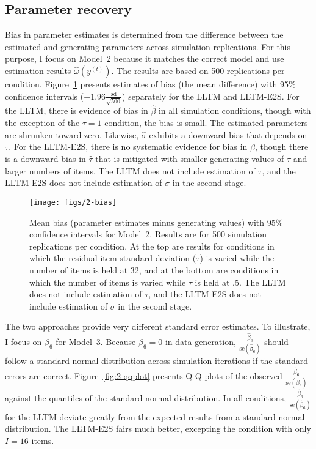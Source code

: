 \subsection{Parameter recovery}

Bias in parameter estimates is determined from the difference between the estimated and generating parameters across simulation replications. 
For this purpose, I focus on Model~2 because it matches the correct model and use estimation results $\hat \omega(y^{(t)})$. 
The results are based on 500 replications per condition. 
Figure~\ref{fig:2-bias} presents estimates of bias (the mean difference) with 95\% confidence intervals ($\pm 1.96 \frac{\mathrm{sd}}{\sqrt{500}}$) separately for the LLTM and LLTM-E2S. 
For the LLTM, there is evidence of bias in $\hat \beta$ in all simulation conditions, though with the exception of the $\tau=1$ condition, the bias is small. 
The estimated parameters are shrunken toward zero.
Likewise, $\hat \sigma$ exhibits a downward bias that depends on $\tau$.
For the LLTM-E2S, there is no systematic evidence for bias in $\hat \beta$, though there is a downward bias in $\hat \tau$ that is mitigated with smaller generating values of $\tau$ and larger numbers of items.
The LLTM does not include estimation of $\tau$, and the LLTM-E2S does not include estimation of $\sigma$ in the second stage.

\begin{figure}
	\centering
	\texttt{[image: figs/2-bias]}
	\caption{Mean bias (parameter estimates minus generating values) with 95\% confidence intervals for Model~2. Results are for 500 simulation replications per condition. At the top are results for conditions in which the residual item standard deviation ($\tau$) is varied while the number of items is held at 32, and at the bottom are conditions in which the number of items is varied while $\tau$ is held at .5. The LLTM does not include estimation of $\tau$, and the LLTM-E2S does not include estimation of $\sigma$ in the second stage.}
	\label{fig:2-bias}
\end{figure}


The two approaches provide very different standard error estimates. To illustrate, I focus on $\beta_6$ for Model~3. Because $\beta_6 = 0$ in data generation,
$\frac{\hat \beta_6}{\mathrm{se}(\hat \beta_6)}$ 
should follow a standard normal distribution across simulation iterations if the standard errors are correct. 
Figure~\ref{fig:2-qqplot} presents Q-Q plots of the observed 
$\frac{\hat \beta_6}{\mathrm{se}(\hat \beta_6)}$ 
against the quantiles of the standard normal distribution. In all conditions, 
$\frac{\hat \beta_6}{\mathrm{se}(\hat \beta_6)}$ 
for the LLTM deviate greatly from the expected results from a standard normal distribution.
The LLTM-E2S fairs much better, excepting the condition with only $I=16$ items.


